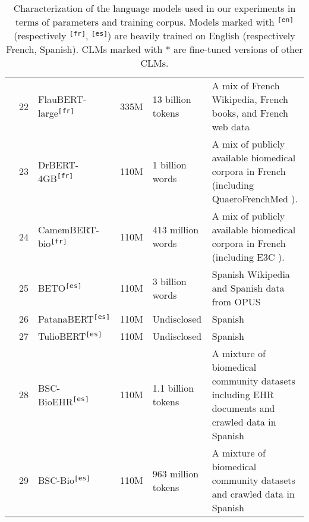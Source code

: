 \begin{table*}[htbp]
{{\begin{tabular}{clp{7cm}rp{3cm}p{10cm}}
\cmidrule{2-6}
 & 22 & FlauBERT-large\textsuperscript{\texttt{[fr]}} \cite{le2019flaubert} & 335M & 13 billion tokens & A mix of French Wikipedia, French books, and French web data \\
\cmidrule{2-6}
 & 23 & DrBERT-4GB\textsuperscript{\texttt{[fr]}} \cite{labrak2023drbert} & 110M & 1 billion words & A mix of publicly available biomedical corpora in French (including QuaeroFrenchMed \cite{neveol2014quaero}). \\
\cmidrule{2-6}
 & 24 & CamemBERT-bio\textsuperscript{\texttt{[fr]}} \cite{touchent2023camembertbio} & 110M & 413 million words & A mix of publicly available biomedical corpora in French (including E3C \cite{magnini2021e3c}). \\
\cmidrule{2-6}
 & 25 & BETO\textsuperscript{\texttt{[es]}} \cite{canete2020beto} & 110M & 3 billion words & Spanish Wikipedia and Spanish data from OPUS \cite{tiedemann2012parallel} \\
\cmidrule{2-6}
 & 26 & PatanaBERT\textsuperscript{\texttt{[es]}} & 110M & Undisclosed & Spanish \\
\cmidrule{2-6}
 & 27 & TulioBERT\textsuperscript{\texttt{[es]}} & 110M & Undisclosed & Spanish \\
\cmidrule{2-6}
 & 28 & BSC-BioEHR\textsuperscript{\texttt{[es]}} \cite{carrino2022pretrained} & 110M & 1.1 billion tokens & A mixture of biomedical community datasets including EHR documents and crawled data in Spanish \\
\cmidrule{2-6}
 & 29 & BSC-Bio\textsuperscript{\texttt{[es]}} \cite{carrino2022pretrained} & 110M & 963 million tokens & A mixture of biomedical community datasets and crawled data in Spanish \\
\bottomrule
\end{tabular}}}
\caption{Characterization of the language models used in our experiments in terms of parameters and training corpus. Models marked with \textsuperscript{\texttt{[en]}} (respectively \textsuperscript{\texttt{[fr]}}, \textsuperscript{\texttt{[es]}}) are heavily trained on English (respectively French, Spanish). CLMs marked with * are fine-tuned versions of other CLMs.}
\label{tab:LM_features}
\end{table*}
